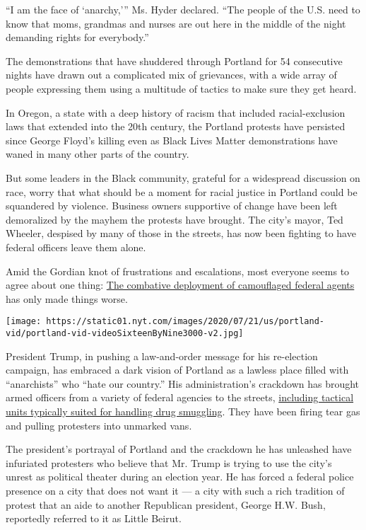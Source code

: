 ``I am the face of `anarchy,''' Ms. Hyder declared. ``The people of the
U.S. need to know that moms, grandmas and nurses are out here in the
middle of the night demanding rights for everybody.''

The demonstrations that have shuddered through Portland for 54
consecutive nights have drawn out a complicated mix of grievances, with
a wide array of people expressing them using a multitude of tactics to
make sure they get heard.

In Oregon, a state with a deep history of racism that included
racial-exclusion laws that extended into the 20th century, the Portland
protests have persisted since George Floyd's killing even as Black Lives
Matter demonstrations have waned in many other parts of the country.

But some leaders in the Black community, grateful for a widespread
discussion on race, worry that what should be a moment for racial
justice in Portland could be squandered by violence. Business owners
supportive of change have been left demoralized by the mayhem the
protests have brought. The city's mayor, Ted Wheeler, despised by many
of those in the streets, has now been fighting to have federal officers
leave them alone.

Amid the Gordian knot of frustrations and escalations, most everyone
seems to agree about one thing:
\href{https://www.nytimes.com/2020/07/17/us/portland-protests.html}{The
combative deployment of camouflaged federal agents} has only made things
worse.

\texttt{[image: https://static01.nyt.com/images/2020/07/21/us/portland-vid/portland-vid-videoSixteenByNine3000-v2.jpg]}

President Trump, in pushing a law-and-order message for his re-election
campaign, has embraced a dark vision of Portland as a lawless place
filled with ``anarchists'' who ``hate our country.'' His
administration's crackdown has brought armed officers from a variety of
federal agencies to the streets,
\href{https://www.nytimes.com/2020/07/18/us/portland-protests.html}{including
tactical units typically suited for handling drug smuggling}. They have
been firing tear gas and pulling protesters into unmarked vans.

The president's portrayal of Portland and the crackdown he has unleashed
have infuriated protesters who believe that Mr. Trump is trying to use
the city's unrest as political theater during an election year. He has
forced a federal police presence on a city that does not want it --- a
city with such a rich tradition of protest that an aide to another
Republican president, George H.W. Bush, reportedly referred to it as
Little Beirut.

